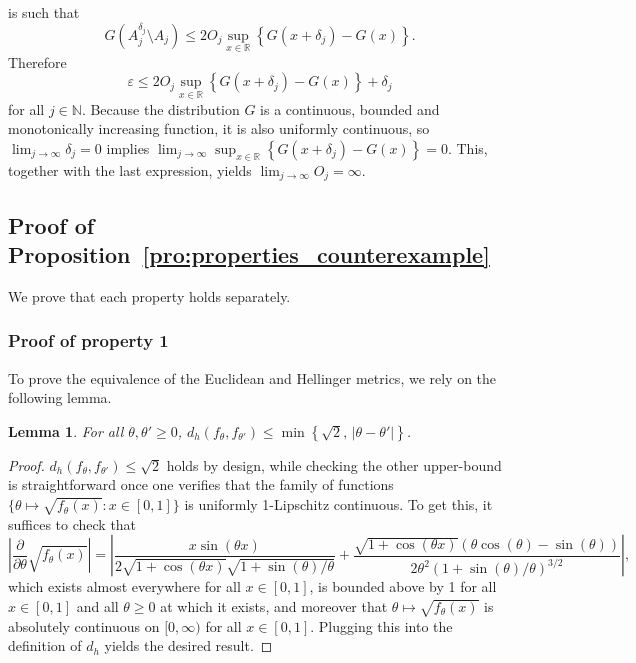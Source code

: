 \documentclass[11pt,twoside]{article}
\newtheorem{lemma}{Lemma}
\def\RR{\mathbb{R}}
\def\NN{\mathbb{N}}
\begin{document}
%
is such that
%
\begin{equation*}
    G(A_j^{\delta_j}\setminus A_j) \leq 2 O_j\sup_{x\in\RR}\left\{G(x+\delta_j) - G(x)\right\}.
\end{equation*}
%
Therefore
%
\begin{equation*}
    \varepsilon\leq 2O_j\sup_{x\in\RR}\left\{G(x+\delta_j) - G(x)\right\} + \delta_j
\end{equation*}
%
for all $j\in\NN$. Because the distribution $G$ is a continuous, bounded and monotonically increasing function, it is also uniformly continuous, so $\lim_{j\to\infty} \delta_j = 0$ implies $\lim_{j\to\infty}\sup_{x\in\RR}\left\{G(x+\delta_j) - G(x)\right\} = 0$. This, together with the last expression, yields $\lim_{j\to\infty} O_j = \infty$.



\subsection*{Proof of Proposition~\ref{pro:properties_counterexample}}%

We prove that each property holds separately.

\subsubsection*{Proof of property 1}

To prove the equivalence of the Euclidean and Hellinger metrics, we rely on the following lemma.

\begin{lemma}\label{lem:hellinger<euclidean}
    For all $\theta, \theta' \geq 0$, $d_h(f_\theta, f_{\theta'}) \leq \min\left\{\sqrt 2,\, |\theta - \theta'|\right\}$.
\end{lemma}

\begin{proof}
    $d_h(f_\theta, f_{\theta'}) \leq \sqrt 2$ holds by design, while checking the other upper-bound is straightforward once one verifies that the family of functions $\{\theta \mapsto \sqrt{f_\theta(x)} : x \in [0,1]\}$ is uniformly 1-Lipschitz continuous. To get this, it suffices to check that
    \begin{equation*}
        \left|\frac{\partial}{\partial \theta}\sqrt{f_\theta(x)}\right|=\left|\frac{x\sin(\theta x)}{2\sqrt{1 + \cos(\theta x)}\sqrt{1 + \sin (\theta)/\theta}} + \frac{\sqrt{1 + \cos(\theta x)}(\theta\cos(\theta) -\sin (\theta))}{2\theta^2(1 + \sin(\theta)/\theta)^{3/2}}\right|,
    \end{equation*}
    which exists almost everywhere for all $x \in [0,1]$, is bounded above by 1 for all $x \in [0,1]$ and all $\theta \geq 0$ at which it exists, and moreover that $\theta\mapsto \sqrt{f_\theta(x)}$ is absolutely continuous on $[0,\infty)$ for all $x\in[0,1]$. Plugging this into the definition of $d_h$ yields the desired result.
\end{proof}
\end{document}

